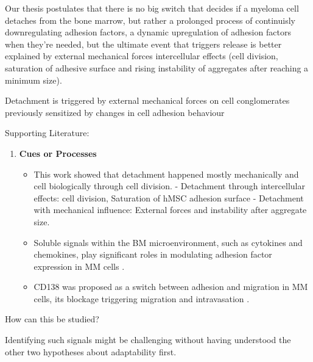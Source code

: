 Our thesis postulates that there is no big switch that decides if a myeloma cell
detaches from the bone marrow, but rather a prolonged process of continuisly
downregulating adhesion factors, a dynamic upregulation of adhesion factors when
they're needed, but the ultimate event that triggers release is better
explained by external mechanical forces intercellular effects (cell division,
saturation of adhesive surface and rising instability of aggregates after
reaching a minimum size).

Detachment is triggered by external mechanical forces on cell
conglomerates previously sensitized by changes in cell adhesion behaviour

Supporting Literature:

\begin{enumerate}
      \item \textbf{Cues or Processes}
            \begin{itemize}
                  \item This work showed that detachment happened mostly
                        mechanically and cell biologically through cell
                        division. - Detachment through intercellular effects:
                        cell division, Saturation of hMSC adhesion surface -
                        Detachment with mechanical influence: External forces
                        and instability after aggregate size.
                  \item Soluble signals within the BM microenvironment, such as
                        cytokines and chemokines, play significant roles in
                        modulating adhesion factor expression in MM cells
                        \cite{aggarwalChemokinesMultipleMyeloma2006,
                              alsayedMechanismsRegulationCXCR42007}.
                  \item CD138 was proposed as a switch between adhesion and
                        migration in MM cells, its blockage triggering migration
                        and intravasation
                        \cite{akhmetzyanovaDynamicCD138Surface2020}.
            \end{itemize}
\end{enumerate}



How can this be studied?

Identifying such signals might be challenging without
having understood the other two hypotheses about adaptability first.





